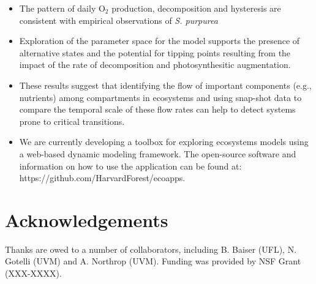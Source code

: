 \documentclass[a0,landscape]{a0poster}
\begin{document}
\begin{multicols}{4}
\begin{itemize}
\item The pattern of daily O$_2$ production, decomposition and
  hysteresis are consistent with empirical observations of
  \textit{S. purpurea}
\item Exploration of the parameter space for the model supports the
  presence of alternative states and the potential for tipping points
  resulting from the impact of the rate of decomposition and
  photosynthesitic augmentation.
\item These results suggest that identifying the flow of important
  components (e.g., nutrients) among compartments in ecosystems and
  using snap-shot data to compare the temporal scale of these flow
  rates can help to detect systems prone to critical transitions.
\item We are currently developing a toolbox for exploring ecosystems
  models using a web-based dynamic modeling framework. The open-source
  software and information on how to use the application can be found
  at:  https://github.com/HarvardForest/ecoapps.
\end{itemize}

\color{DarkSlateGray} %





\nocite{*} %


\section*{Acknowledgements}

Thanks are owed to a number of collaborators, including B. Baiser
(UFL), N. Gotelli (UVM) and A. Northrop (UVM). Funding was provided by
NSF Grant (XXX-XXXX). 


\end{multicols}
\end{document}
